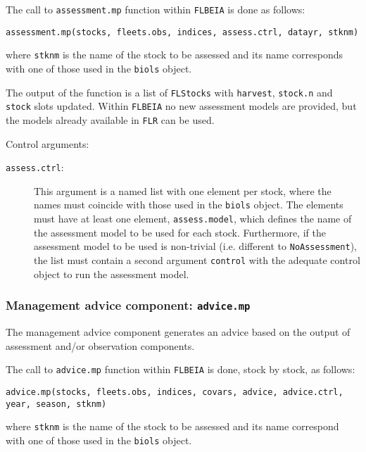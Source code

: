 	\noindent The call to \texttt{assessment.mp} function within \texttt{FLBEIA} is done as follows:
	
  \begin{center}
  	\texttt{assessment.mp(stocks, fleets.obs, indices, assess.ctrl, datayr, stknm)}
  \end{center} 
  
  \noindent where \texttt{stknm} is the name of the stock to be assessed and its name corresponds with one of those used 
  in the \texttt{biols} object.

	The output of the function is a list of \texttt{FLStocks} with \texttt{harvest}, \texttt{stock.n} and \texttt{stock}
	slots updated. Within \texttt{FLBEIA} no new assessment models are provided, but the models already available in \texttt{FLR}
	can be used. 

\noindent Control arguments:
\begin{description}
  \item[\texttt{assess.ctrl}:] This argument is a named list with one element per stock, where the names must coincide with those
  used in the \texttt{biols} object. The elements must have at least one element, \texttt{assess.model}, which defines the name of 
	the assessment model to be used for each stock. Furthermore, if the assessment model to be used is non-trivial 
	(i.e. different to \texttt{NoAssessment}), the list must contain a second argument  \texttt{control} with the adequate control object
	to run the assessment model.
\end{description}

	
	\subsubsection{Management advice component: \texttt{advice.mp}}
	
	The management advice component generates an advice based on the output of assessment and/or observation components.  
	
	\noindent The call to \texttt{advice.mp} function within \texttt{FLBEIA} is done, stock by stock, as follows:

  \begin{center}	
  	\texttt{advice.mp(stocks, fleets.obs, indices, covars, advice, advice.ctrl, year, season, stknm)}
  \end{center}
  
  \noindent where \texttt{stknm} is the name of the stock to be assessed and its name correspond with one of those used 
  in the \texttt{biols} object.

